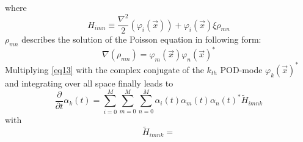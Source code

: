 \documentclass[usenatbib]{mn2e}
\begin{document}
where
\begin{equation}\label{eq14}
H_{imn} \equiv \dfrac {\nabla ^{2}} {2}(\varphi_i(\overrightarrow{x}))+\varphi_i(\overrightarrow{x}) \xi \rho_{mn}
\end{equation}  
\(\rho_{mn}\) describes the solution of the Poisson equation in following form: 
\begin{equation}\label{eq15}
\nabla(\rho_{mn}) = \varphi_m(\overrightarrow{x}) \varphi_n(\overrightarrow{x})^*
\end{equation}
Multiplying \ref{eq13} with the complex conjugate of the \(k_{th}\) POD-mode \(\varphi_{k}(\overrightarrow{x})^*\) and integrating over all space finally leads to
\begin{equation}\label{eq16}
\dfrac {\partial } {\partial t} \alpha_k(t) = \sum_{i=0}^M \sum_{m=0}^M \sum_{n=0}^M \alpha_i(t) \alpha_m(t) \alpha_n(t)^* \widetilde{H}_{imnk}
\end{equation}
with
\begin{equation}\label{eq17}
\widetilde{H}_{imnk} = 
\end{equation}




\def\aap{A\&A}
\def\araa{ARA\&A}
\def\apjl{APJL}
\def\mnras{MNRAS}
\def\nat{Nature}
\def\prd{Phys Rev D}


\end{document}
